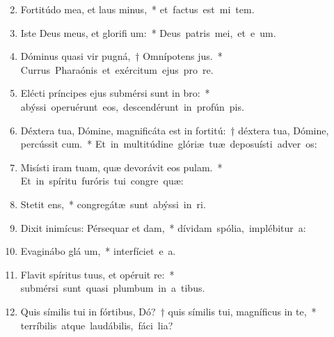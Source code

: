 \begin{flushleft}
\begin{enumerate}[leftmargin=*]
\setcounter{enumi}{1}


\item Fortitúdo mea, et laus  minus,~* \mbox{et factus est mi  tem.}
\item Iste Deus meus, et glorifi um:~* \mbox{Deus patris mei, et e um.}
\item Dóminus quasi vir pugná,~† Omnípotens  jus.~* \mbox{Currus Pharaónis et exércitum ejus pro  re.}
\item Elécti príncipes ejus submérsi sunt in  bro:~* \mbox{abýssi operuérunt eos, descendérunt in profún  pis.}
\item Déxtera tua, Dómine, magnificáta est in fortitú:~† déxtera tua, Dómine, percússit cum.~* \mbox{Et in multitúdine glóriæ tuæ deposuísti adver os:}
\item Misísti iram tuam, quæ devorávit eos  pulam.~* \mbox{Et in spíritu furóris tui congre  quæ:}
\item Stetit  ens,~* \mbox{congregátæ sunt abýssi in  ri.}
\item Dixit inimícus: Pérsequar et dam,~* \mbox{dívidam spólia, implébitur  a:}
\item Evaginábo glá um,~* \mbox{interfíciet e  a.}
\item Flavit spíritus tuus, et opéruit  re:~* \mbox{submérsi sunt quasi plumbum in a tibus.}
\item Quis símilis tui in fórtibus, Dó?~† quis símilis tui, magníficus in te,~* \mbox{terríbilis atque laudábilis, fáci lia?}

\end{enumerate}
\end{flushleft}
